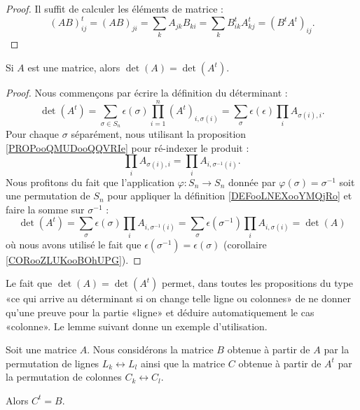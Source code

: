 \begin{proof}
    Il suffit de calculer les éléments de matrice :
    \begin{equation}
        (AB)^t_{ij}=(AB)_{ji}=\sum_k A_{jk}B_{ki}=\sum_kB^t_{ik}A^t_{kj}=(B^tA^t)_{ij}.
    \end{equation}
\end{proof}

\begin{lemma}        \label{LEMooCEQYooYAbctZ}
    Si \( A\) est une matrice, alors \( \det(A)=\det(A^t)\).
\end{lemma}

\begin{proof}
    Nous commençons par écrire la définition du déterminant :
    \begin{equation}
        \det(A^t)=\sum_{\sigma\in S_n}\epsilon(\sigma)\prod_{i=1}^n(A^t)_{i,\sigma(i)}=\sum_{\sigma}\epsilon(\epsilon)\prod_iA_{\sigma(i),i}.
    \end{equation}
    Pour chaque \( \sigma\) séparément, nous utilisant la proposition \ref{PROPooQMUDooQQVRIe} pour ré-indexer le produit :
    \begin{equation}
        \prod_i A_{\sigma(i),i}=\prod_iA_{i,\sigma^{-1}(i)}.
    \end{equation}
    Nous profitons du fait que l'application \( \varphi\colon S_n\to S_n\) donnée par \( \varphi(\sigma)=\sigma^{-1}\) soit une permutation de \( S_n\) pour appliquer la définition \ref{DEFooLNEXooYMQjRo} et faire la somme sur \( \sigma^{-1}\) :
    \begin{equation}
        \det(A^t)=\sum_{\sigma}\epsilon(\sigma)\prod_iA_{i,\sigma^{-1}(i)}=\sum_{\sigma}\epsilon(\sigma^{-1})\prod_iA_{i,\sigma(i)}=\det(A)
    \end{equation}
    où nous avons utilisé le fait que \(\epsilon(\sigma^{-1})=\epsilon(\sigma)\) (corollaire \ref{CORooZLUKooBOhUPG}).
\end{proof}

Le fait que \( \det(A)=\det(A^t)\) permet, dans toutes les propositions du type «ce qui arrive au déterminant si on change telle ligne ou colonnes» de ne donner qu'une preuve pour la partie «ligne» et déduire automatiquement le cas «colonne». Le lemme suivant donne un exemple d'utilisation.

\begin{lemma}        \label{LEMooWMQWooGWFlmC}
    Soit une matrice \( A\). Nous considérons la matrice \( B\) obtenue à partir de \( A\) par la permutation de lignes \( L_k\leftrightarrow L_l\) ainsi que la matrice \( C\) obtenue à partir de \( A^t\) par la permutation de colonnes \( C_k\leftrightarrow C_l\).
    
    Alors \( C^t=B\).
\end{lemma}

